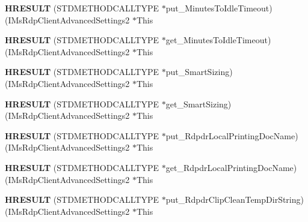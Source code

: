 \begin{DoxyCompactItemize}
{\bfseries H\+R\+E\+S\+U\+LT} (S\+T\+D\+M\+E\+T\+H\+O\+D\+C\+A\+L\+L\+T\+Y\+PE $\ast$put\+\_\+\+Minutes\+To\+Idle\+Timeout)(I\+Ms\+Rdp\+Client\+Advanced\+Settings2 $\ast$This
\item 
\mbox{\label{struct_i_ms_rdp_client_advanced_settings2_vtbl_a268f6dd66406a853f966a5fcd43a0922}} 
{\bfseries H\+R\+E\+S\+U\+LT} (S\+T\+D\+M\+E\+T\+H\+O\+D\+C\+A\+L\+L\+T\+Y\+PE $\ast$get\+\_\+\+Minutes\+To\+Idle\+Timeout)(I\+Ms\+Rdp\+Client\+Advanced\+Settings2 $\ast$This
\item 
\mbox{\label{struct_i_ms_rdp_client_advanced_settings2_vtbl_ae4f9fe9d606cc3699141e755301ec5cf}} 
{\bfseries H\+R\+E\+S\+U\+LT} (S\+T\+D\+M\+E\+T\+H\+O\+D\+C\+A\+L\+L\+T\+Y\+PE $\ast$put\+\_\+\+Smart\+Sizing)(I\+Ms\+Rdp\+Client\+Advanced\+Settings2 $\ast$This
\item 
\mbox{\label{struct_i_ms_rdp_client_advanced_settings2_vtbl_a27c8e451b2baa90ffc26f9db32c9c474}} 
{\bfseries H\+R\+E\+S\+U\+LT} (S\+T\+D\+M\+E\+T\+H\+O\+D\+C\+A\+L\+L\+T\+Y\+PE $\ast$get\+\_\+\+Smart\+Sizing)(I\+Ms\+Rdp\+Client\+Advanced\+Settings2 $\ast$This
\item 
\mbox{\label{struct_i_ms_rdp_client_advanced_settings2_vtbl_ae35511c74ab3b10cd3517c5cfcd25aea}} 
{\bfseries H\+R\+E\+S\+U\+LT} (S\+T\+D\+M\+E\+T\+H\+O\+D\+C\+A\+L\+L\+T\+Y\+PE $\ast$put\+\_\+\+Rdpdr\+Local\+Printing\+Doc\+Name)(I\+Ms\+Rdp\+Client\+Advanced\+Settings2 $\ast$This
\item 
\mbox{\label{struct_i_ms_rdp_client_advanced_settings2_vtbl_aca588b769806521f7635c16d560c0606}} 
{\bfseries H\+R\+E\+S\+U\+LT} (S\+T\+D\+M\+E\+T\+H\+O\+D\+C\+A\+L\+L\+T\+Y\+PE $\ast$get\+\_\+\+Rdpdr\+Local\+Printing\+Doc\+Name)(I\+Ms\+Rdp\+Client\+Advanced\+Settings2 $\ast$This
\item 
\mbox{\label{struct_i_ms_rdp_client_advanced_settings2_vtbl_a747b083eab7c8e9edd15b0b37f0c6457}} 
{\bfseries H\+R\+E\+S\+U\+LT} (S\+T\+D\+M\+E\+T\+H\+O\+D\+C\+A\+L\+L\+T\+Y\+PE $\ast$put\+\_\+\+Rdpdr\+Clip\+Clean\+Temp\+Dir\+String)(I\+Ms\+Rdp\+Client\+Advanced\+Settings2 $\ast$This

\end{DoxyCompactItemize}
